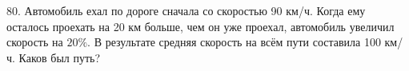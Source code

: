 80. Автомобиль ехал по дороге сначала со скоростью 90 км/ч. Когда ему осталось проехать на
20 км больше, чем он уже проехал, автомобиль увеличил скорость на $20\%.$ В результате средняя
скорость на всём пути составила 100 км/ч. Каков был путь?\\
